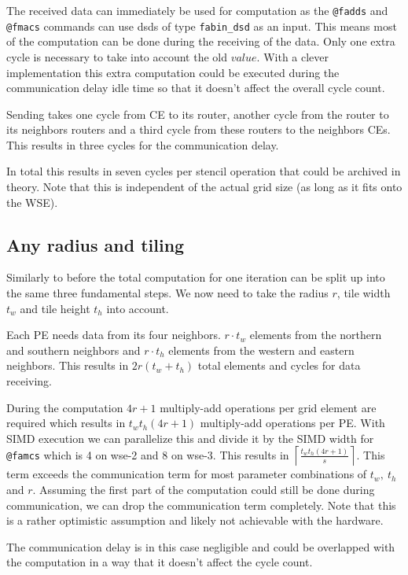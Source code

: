\documentclass{article}
\begin{document}
The received data can immediately be used for computation as the \texttt{@fadds} and \texttt{@fmacs} commands can use dsds of type \texttt{fabin\_dsd} as an input. This means most of the computation can be done during the receiving of the data. Only one extra cycle is necessary to take into account the old $value$. With a clever implementation this extra computation could be executed during the communication delay idle time so that it doesn't affect the overall cycle count.

Sending takes one cycle from CE to its router, another cycle from the router to its neighbors routers and a third cycle from these routers to the neighbors CEs. This results in three cycles for the communication delay.

In total this results in seven cycles per stencil operation that could be archived in theory.
Note that this is independent of the actual grid size (as long as it fits onto the WSE).


\subsection{Any radius and tiling}
Similarly to before the total computation for one iteration can be split up into the same three fundamental steps. We now need to take the radius $r$, tile width $t_w$ and tile height $t_h$ into account.

Each PE needs data from its four neighbors. $r\cdot t_w$ elements from the northern and southern neighbors and $r\cdot t_h$ elements from the western and eastern neighbors. This results in $2r(t_w+t_h)$ total elements and cycles for data receiving.

During the computation $4r+1$ multiply-add operations per grid element are required which results in $t_wt_h(4r+1)$ multiply-add operations per PE. With SIMD execution we can parallelize this and divide it by the SIMD width for \texttt{@famcs} which is 4 on wse-2 and 8 on wse-3. This results in $\left\lceil\frac{t_wt_h(4r+1)}{s}\right\rceil$. This term exceeds the communication term for most parameter combinations of $t_w,\ t_h$ and $r$. Assuming the first part of the computation could still be done during communication, we can drop the communication term completely. Note that this is a rather optimistic assumption and likely not achievable with the hardware.

The communication delay is in this case negligible and could be overlapped with the computation in a way that it doesn't affect the cycle count. 
\end{document}
